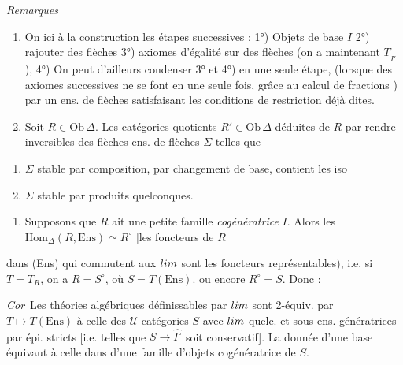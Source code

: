 \documentclass[11pt,a4paper]{article}
\begin{document}
\emph{Remarques}\ \begin{enumerate}
  \item[(1)] On   ici à la construction les
    étapes successives : 1°) Objets de base $I$ 2°) rajouter des flèches
    3°) axiomes d'égalité sur des  flèches (on a
    maintenant $T_{\tilde{I}'}$), 4°)     On peut d'ailleurs condenser 3° et 4°) en
    une seule étape, \ill{} (lorsque des axiomes successives ne se font
    \ill{} en une seule fois, grâce au calcul de fractions  ) par un ens. de
    flèches satisfaisant les conditions de restriction déjà dites.
  \item[(2)] Soit $R \in \mathrm{Ob}\,\Delta$. Les catégories quotients
    $R' \in \mathrm{Ob}\,\Delta$ déduites de $R$ par rendre inversibles
    des flèches   ens. de flèches $\Sigma$ \add{$\Sigma$} telles que
\end{enumerate}

\begin{enumerate}
  \item[a)] $\Sigma$ stable par composition, par changement de base,
    contient les iso
  \item[b)] $\Sigma$ stable par produits quelconques.
\end{enumerate}

\begin{enumerate}
  \item[(3)] Supposons que $R$ ait une petite famille
    \emph{cogénératrice} $I$. Alors les $\mathrm{Hom}_{\Delta}(R,
    \mathrm{Ens}) \simeq R^{\circ}$ [les foncteurs de $R$
\end{enumerate}

dans (Ens) qui commutent aux $\varprojlim$ sont les foncteurs
représentables), i.e. si $T = T_{R}$, on a $R = S^{\circ}$, où $S =
T(\mathrm{Ens})$. \struck{\ill{}}  ou encore
$R^{\circ} = S$. Donc :

\emph{Cor}\ Les théories algébriques définissables par
$\varprojlim$   sont 2-équiv. par $T \mapsto T(\mathrm{Ens})$ à celle des
$\mathcal{U}$-catégories $S$ avec $\varprojlim$ quelc. et
  sous-ens. génératrices par épi. stricts
[i.e. telles que $S \to \widehat{I^{\circ}}$ soit conservatif]. La donnée
d'une base  équivaut à celle dans \ill{} d'une famille
d'objets cogénératrice de $S$.
\end{document}
